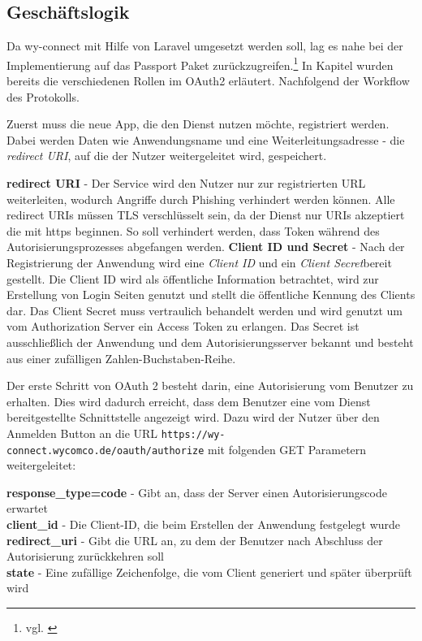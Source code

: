 
\subsection{Geschäftslogik}
\label{sec:Geschaeftslogik}

Da wy-connect mit Hilfe von Laravel umgesetzt werden soll, lag es nahe bei der Implementierung auf das Passport Paket zurückzugreifen.\footnote{vgl. \cite{Passport}}
In Kapitel  wurden bereits die verschiedenen Rollen im OAuth2 erläutert. Nachfolgend der Workflow des Protokolls.

Zuerst muss die neue App, die den Dienst nutzen möchte, registriert werden. Dabei werden Daten wie Anwendungsname und eine Weiterleitungsadresse - die \textit{redirect URI}, auf die der Nutzer weitergeleitet wird, gespeichert.

\textbf{redirect URI} -
Der Service wird den Nutzer nur zur registrierten URL weiterleiten, wodurch Angriffe durch \zB Phishing verhindert werden können. Alle redirect URIs müssen TLS verschlüsselt sein, da der Dienst nur URIs akzeptiert die mit \glqq https\grqq{}  beginnen. So soll verhindert werden, dass Token während des Autorisierungsprozesses abgefangen werden. 
\textbf{Client ID und Secret} -
Nach der Registrierung der Anwendung wird eine \textit{Client ID} und ein \textit{Client Secret}bereit gestellt. Die Client ID wird als öffentliche Information betrachtet, wird zur Erstellung von Login Seiten genutzt und stellt die öffentliche Kennung des Clients dar. 
Das Client Secret muss vertraulich behandelt werden und wird genutzt um vom Authorization Server ein Access Token zu erlangen. Das Secret ist ausschließlich der Anwendung und dem Autorisierungsserver bekannt und besteht aus einer zufälligen Zahlen-Buchstaben-Reihe. 

Der erste Schritt von OAuth 2 besteht darin, eine Autorisierung vom Benutzer zu erhalten. Dies wird dadurch erreicht, dass dem Benutzer eine vom Dienst bereitgestellte Schnittstelle angezeigt wird. Dazu wird der Nutzer über den Anmelden Button an die URL \texttt{https://wy-connect.wycomco.de/oauth/authorize} mit folgenden GET Parametern weitergeleitet:

\textbf{response\_type=code} - Gibt an, dass der Server einen Autorisierungscode erwartet \\
\textbf{client\_id} - Die Client-ID, die beim Erstellen der Anwendung festgelegt wurde \\
\textbf{redirect\_uri} - Gibt die URL an, zu dem der Benutzer nach Abschluss der Autorisierung zurückkehren soll \\
\textbf{state} - Eine zufällige Zeichenfolge, die vom Client generiert und später überprüft wird

